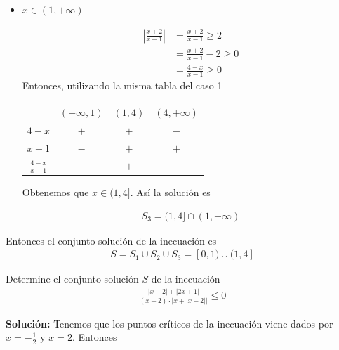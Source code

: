 \documentclass[12pt]{book}
\begin{document}
\begin{itemize}
\begin{center}
\begin{tabular}{|c|c|c|c|}
$-3x$ & $+$ & $-$ & $-$ \\ \hline
$x-1$ & $-$ & $-$ & $+$\\ \hline \hline
$\displaystyle -\frac{3x}{x-1}$ & $-$ & $+$ &$-$ \\ 
   \hline
\end{tabular}
\end{center}

De la tabla $x \in [0,1)$. Así la solución es 

\begin{align*}
    S_2= (-2,1) \cap [0,1) = [0,1)
\end{align*}

\item $x \in (1,+\infty)$


\begin{align*}
    \left|\frac{x+2}{x-1} \right|&=\frac{x+2}{x-1} \geq 2 \\
    &= \frac{x+2}{x-1} - 2 \geq 0 \\
    &=\frac{4-x}{x-1}\geq 0
\end{align*}
Entonces, utilizando la misma tabla del caso 1 

\begin{center}
\begin{tabular}{|c|c|c|c|}
\hline
   & $(-\infty,1) $  & $(1,4)$ & $(4,+\infty)$ \\
   \hline
   $4-x$ & $+$ &$+$ &  $-$ \\ \hline
   $x-1$ & $-$ & $+$ & $+$ \\ \hline \hline
\rule{0pt}{20pt} $\displaystyle \frac{4-x}{x-1}$ & $-$ & $+$ & $-$ \\
   \hline
\end{tabular}
\end{center}

Obtenemos que $x \in (1,4]$. Así la solución es 

\begin{align*}
    S_3= (1,4]\cap(1 , +\infty) 
\end{align*}
\end{itemize}
Entonces el conjunto solución de la inecuación es 
\begin{align*}
    S=S_1 \cup S_2 \cup S_3=[0,1) \cup (1,4]
\end{align*}

\begin{prob}{}{}
   Determine el conjunto solución $S$ de la inecuación
 \begin{align*}
     \frac{|x-2|+|2x+1|}{(x-2)\cdot|x+|x-2||} \leq 0
 \end{align*}
\end{prob}
\textbf{Solución:} Tenemos que los puntos críticos de la inecuación viene dados por $x=-\frac{1}{2}$ y $x=2$. Entonces 
\end{document}
